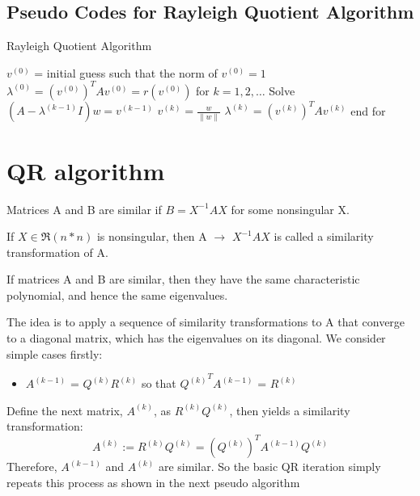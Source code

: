 \subsection{Pseudo Codes for Rayleigh Quotient Algorithm}
\begin{algorithm}
    \caption{Rayleigh Quotient Algorithm}
    \begin{algorithmic}
        \STATE \( v^{(0)} \) = initial guess such that the norm of \( v^{(0)} = 1 \)
        \STATE \(\lambda^{(0)} = {(v^{(0)})}^T  Av^{(0)} = r(v^{(0)})\)
        \STATE for \( k = 1, 2, \dots \)
        \STATE \quad Solve \((A-\lambda^{(k-1)}I)w=v^{(k-1)} \)
        \STATE \quad \( v^{(k)} = \frac{w}{\|w\|} \)
        \STATE \quad \( \lambda^{(k)} = (v^{(k)})^T A v^{(k)} \)
        \STATE end for
    \end{algorithmic}
\end{algorithm}
\section{QR algorithm}
\label{Section QR algorithm}
\begin{definition}
    Matrices A and B are similar if $B = X^{-1}AX$ for some nonsingular X.
\end{definition}
\begin{definition}
    \label{similarity transformation}
    If $X\in \Re{(n*n)}$ is nonsingular, then A $\rightarrow$ $X^{-1}AX$ is called a similarity transformation of A.
\end{definition}
\begin{theorem}
    If matrices A and B are similar, then they have the same characteristic polynomial, and hence the same eigenvalues.
\end{theorem}
The idea is to apply a sequence of similarity transformations to A that converge to a diagonal matrix, which has the eigenvalues on its diagonal.
We consider simple cases firstly:
    \begin{itemize}
        \item $A^{(k-1)}$ = $Q^{(k)}R^{(k)}$ so that
        \centering ${Q^{(k)}}^TA^{(k-1)}$ = $R^{(k)}$
    \end{itemize}
Define the next matrix, $A^(k)$, as $R^{(k)}Q^{(k)}$, then yields a similarity transformation:
    \begin{equation}
        A^{(k)} := R^{(k)}Q^{(k)}
        =({Q^{(k)}})^TA^{(k-1)}Q^{(k)}
    \end{equation}
Therefore, $A^{(k-1)}$ and $A^{(k)}$ are similar.
So the basic QR iteration simply repeats this process as shown in the next pseudo algorithm
